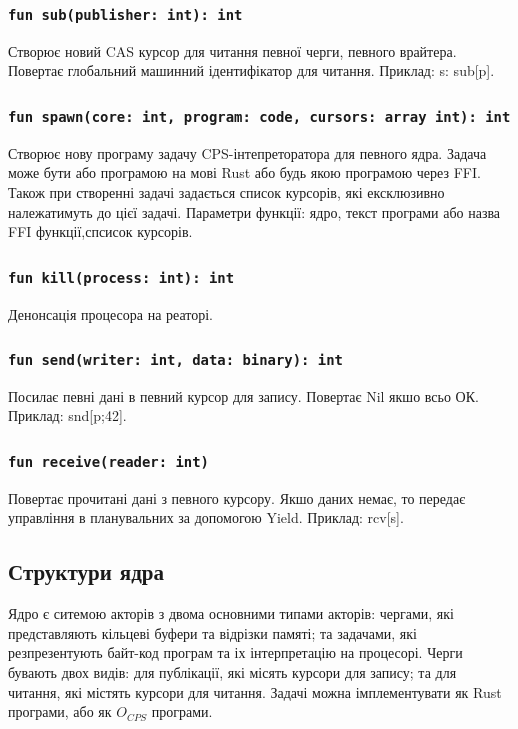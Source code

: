 \documentclass{article}
\begin{document}
\subsubsection*{\lstinline{fun sub(publisher: int): int}}
Створює новий CAS курсор для читання певної черги, певного врайтера.
Повертає глобальний машинний ідентифікатор для читання.
Приклад: s: sub[p].

\subsubsection*{\lstinline{fun spawn(core: int, program: code, cursors: array int): int}}
Створює нову програму задачу CPS-інтепреторатора для певного ядра.
Задача може бути або програмою на мові Rust або будь якою програмою через FFI.
Також при створенні задачі задається список курсорів,
які ексклюзивно належатимуть до цієї задачі.
Параметри функції: ядро, текст програми або назва FFI функції,спсисок курсорів.

\subsubsection*{\lstinline{fun kill(process: int): int}}
Денонсація процесора на реаторі.

\subsubsection*{\lstinline{fun send(writer: int, data: binary): int}}
Посилає певні дані в певний курсор для запису. Повертає Nil якшо всьо ОК.
Приклад: snd[p;42].

\subsubsection*{\lstinline{fun receive(reader: int)}}
Повертає прочитані дані з певного курсору.
Якшо даних немає, то передає управління в планувальних за допомогою Yield.
Приклад: rcv[s].

\newpage
\subsection{Структури ядра}
Ядро є ситемою акторів з двома основними типами акторів:
чергами, які представляють кільцеві буфери та відрізки памяті;
та задачами, які резпрезентують байт-код програм та іх інтерпретацію на процесорі.
Черги бувають двох видів: для публікації, які місять курсори для запису;
та для читання, які містять курсори для читання. Задачі можна імплементувати
як Rust програми, або як $O_{CPS}$ програми.
\end{document}
